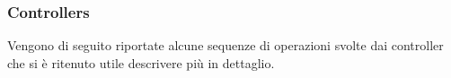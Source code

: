 \subsubsection{Controllers}
Vengono di seguito riportate alcune sequenze di operazioni svolte dai controller che si è ritenuto utile descrivere più in dettaglio.

